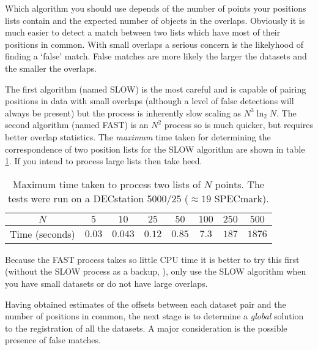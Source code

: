 Which algorithm you should use depends of the number of points your
positions lists contain and the expected number of objects in the 
overlaps. Obviously it is much easier to detect a match between  two
lists which have most of their positions in common. With small overlaps
a serious concern is the likelyhood of finding a `false' match. False
matches are more likely the larger the datasets and the smaller the
overlaps.

The first algorithm (named SLOW) is the most careful and is capable of
pairing positions in data with small overlaps (although a level of false
detections will always be present) but the process is inherently slow
scaling as $N^{3}\ln_{2}N$. The second algorithm (named FAST) is an
$N^2$ process so is much quicker, but requires better overlap
statistics. The {\em maximum} time taken for determining the
correspondence of two position lists for the SLOW algorithm are shown in
table \ref{table1}. If you intend to process large lists then take heed.

\begin{table}[htb]
\begin{center}
\begin{tabular}{|c|c|c|c|c|c|c|c|}
\hline
$N$ & $5$ & $10$ & $25$ & $50$ & $100$ & $250$ & $500$ \\
\hline
Time (seconds) & 
     $0.03$ & $0.043$ & $0.12$ & $0.85$ & $7.3$ & $187$ & $1876$ \\
\hline
\end{tabular}
\caption{ \label{table1} 
Maximum time taken to process two lists of $N$ points. The tests were
run on a DECstation 5000/25 ($\approx 19$ SPECmark).}
\end{center}
\end{table}

Because the FAST process takes so little CPU time it is better to try
this first (without the SLOW process as a backup, 
), only
use the SLOW algorithm when you have small datasets or do not have large
overlaps.

Having obtained estimates of the offsets between each dataset pair and
the number of positions in common, the next stage is to determine a {\em
global} solution to the registration of all the datasets. A major
consideration is the possible presence of false matches. 

